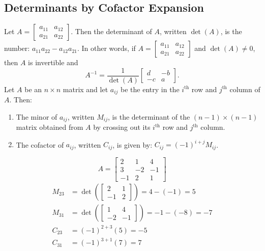 \documentclass[12pt]{article}
\begin{document}
  \subsection{Determinants by Cofactor Expansion}
  Let $A = \begin{bmatrix} a_{11} & a_{12} \\ a_{21} & a_{22} \end{bmatrix}$. Then the determinant of $A$, written $\det (A)$, is the number: $a_{11}a_{22} - a_{12}a_{21}$. In other words, if $A = \begin{bmatrix} a_{11} & a_{12} \\ a_{21} & a_{22} \end{bmatrix} $ and $ \det (A) \neq 0$, then $A$ is invertible and $$A^{-1} = \frac{1}{\det(A)} \begin{bmatrix} d & -b \\ -c & a \end{bmatrix}. $$ 
  Let $A$ be an $n \times n$ matrix and let $a_{ij}$ be the entry in the $i^\text{th}$ row and $j^\text{th}$ column of $A$. Then: \begin{enumerate} \item The minor of $a_{ij}$, written $M_{ij}$, is the determinant of the $(n -1) \times (n - 1)$ matrix obtained from $A$ by crossing out its $i^\text{th}$ row and $j^\text{th}$ column. 
  \item The cofactor of $a_{ij}$, written $C_{ij}$, is given by: $C_{ij} = (-1)^{i + j}M_{ij}$. \end{enumerate} 
  \begin{example} $$A = \begin{bmatrix} 2 & 1 & 4 \\ 3 & -2 & -1 \\ -1 & 2 & 1 \end{bmatrix}$$ 
  \begin{align*} M_{23} &= \det(\begin{bmatrix} 2 & 1 \\ -1 & 2 \end{bmatrix}) = 4 - (-1) = 5 \\
  M_{31} &= \det(\begin{bmatrix} 1 & 4 \\ -2 & -1 \end{bmatrix}) = -1 - (-8) = -7 \\ 
  C_{23} &= (-1)^{2 + 3}(5) = -5 \\ C_{31} &= (-1)^{3 + 1}(7) = 7 \end{align*} \end{example} 
\end{document}

